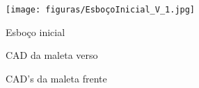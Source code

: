 \begin{apendicesenv}
\begin{figure}[htb]
    \centering
    \texttt{[image: figuras/EsboçoInicial\_V\_1.jpg]}
    \caption{Esboço inicial}
    \label{fig:esboço}
\end{figure}

\begin{figure} [H]
\centering
  \caption{CAD da maleta verso}
\end{figure}

\begin{figure} [H]
\centering
  \caption{CAD's da maleta frente}
\end{figure}


\end{apendicesenv}
